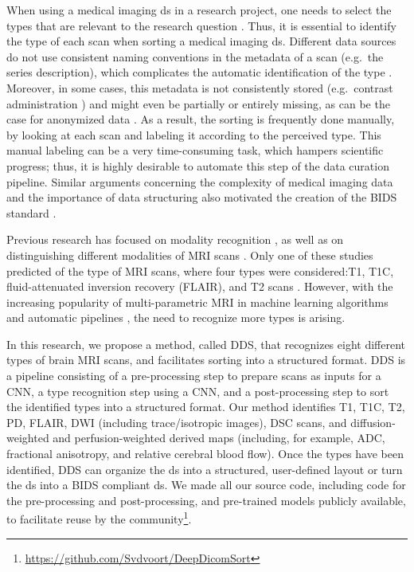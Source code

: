 When using a medical imaging \gls{ds} in a research project, one needs to select the \glspl{type} that are relevant to the research question \autocite{montagnon2020deep, lambin2017radiomics}.
Thus, it is essential to identify the \gls{type} of each \gls{scan} when sorting a medical imaging \gls{ds}.
Different data sources do not use consistent naming conventions in the metadata of a \gls{scan} (e.g.\ the series description), which complicates the automatic identification of the \gls{type} \autocite{vanooijen2019quality, wang2011automated}.
Moreover, in some cases, this metadata is not consistently stored (e.g.\ contrast administration \autocite{hirsch2015we}) and might even be partially or entirely missing, as can be the case for anonymized data \autocite{moore2015identification}.
As a result, the sorting is frequently done manually, by looking at each \gls{scan} and labeling it according to the perceived \gls{type}.
This manual labeling can be a very time-consuming task, which hampers scientific progress; thus, it is highly desirable to automate this step of the data curation pipeline.
Similar arguments concerning the complexity of medical imaging data and the importance of data structuring also motivated the creation of the \gls{BIDS} standard \autocite{gorgolewski2016brain}.

Previous research has focused on modality recognition \autocite{dimitrovski2015improved,arias2016medical}, as well as on distinguishing different modalities of \gls{MRI} \glspl{scan} \autocite{srinivas2014medical,remedios2018classifying}.
Only one of these studies predicted of the \gls{type} of \gls{MRI} \glspl{scan}, where four \glspl{type} were considered:\gls{T1}, \gls{T1C}, fluid-attenuated inversion recovery (FLAIR), and \gls{T2} \glspl{scan} \autocite{remedios2018classifying}.
However, with the increasing popularity of multi-parametric \gls{MRI} in machine learning algorithms and automatic pipelines \autocite{li2017deep,akkus2017predicting,nie20163d,pereira2015deep}, the need to recognize more \glspl{type} is arising.

In this research, we propose a method, called \gls{DDS}, that recognizes eight different \glspl{type} of brain \gls{MRI} \glspl{scan}, and facilitates sorting into a structured format.
\gls{DDS} is a pipeline consisting of a pre-processing step to prepare \glspl{scan} as inputs for a \gls{CNN}, a \gls{type} recognition step using a \gls{CNN}, and a post-processing step to sort the identified \glspl{type} into a structured format.
Our method identifies \gls{T1}, \gls{T1C}, \gls{T2}, \gls{PD}, \gls{FLAIR}, \gls{DWI} (including trace/isotropic images), \gls{DSC} \glspl{scan}, and diffusion-weighted and perfusion-weighted derived maps (including, for example, \gls{ADC}, fractional anisotropy, and relative cerebral blood flow).
Once the \glspl{type} have been identified, \gls{DDS} can organize the \gls{ds} into a structured, user-defined layout or turn the \gls{ds} into a \gls{BIDS} compliant \gls{ds}.
We made all our source code, including code for the pre-processing and post-processing, and pre-trained models publicly available, to facilitate reuse by the community\footnote{\url{https://github.com/Svdvoort/DeepDicomSort}}.


